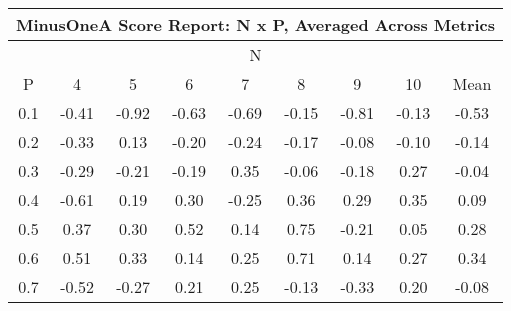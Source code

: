 \begin{longtable}{ | c || c | c | c | c | c | c | c || c |}
\hline
\multicolumn{9}{|c|}{ MinusOneA Score Report: N x P, Averaged Across Metrics } \\
\hline
\multicolumn{9}{|c|}{ N } \\
\hline
P & 4 & 5 & 6 & 7 & 8 & 9 & 10 & Mean\\
\hline
\hline
\endhead
0.1 &  \cellcolor[HTML]{FFF7F7} -0.41 &  \cellcolor[HTML]{FFE7E7} -0.92 &  \cellcolor[HTML]{FFEFEF} -0.63 &  \cellcolor[HTML]{FFEFEF} -0.69 &  \cellcolor[HTML]{FFFFFF} -0.15 &  \cellcolor[HTML]{FFE7E7} -0.81 &  \cellcolor[HTML]{FFFFFF} -0.13 &  \cellcolor[HTML]{FFEFEF} -0.53 \\
0.2 &  \cellcolor[HTML]{FFF7F7} -0.33 &  \cellcolor[HTML]{FFFFFF} 0.13 &  \cellcolor[HTML]{FFF7F7} -0.20 &  \cellcolor[HTML]{FFF7F7} -0.24 &  \cellcolor[HTML]{FFF7F7} -0.17 &  \cellcolor[HTML]{FFFFFF} -0.08 &  \cellcolor[HTML]{FFFFFF} -0.10 &  \cellcolor[HTML]{FFFFFF} -0.14 \\
0.3 &  \cellcolor[HTML]{FFF7F7} -0.29 &  \cellcolor[HTML]{FFF7F7} -0.21 &  \cellcolor[HTML]{FFF7F7} -0.19 &  \cellcolor[HTML]{F7F7FF} 0.35 &  \cellcolor[HTML]{FFFFFF} -0.06 &  \cellcolor[HTML]{FFF7F7} -0.18 &  \cellcolor[HTML]{F7F7FF} 0.27 &  \cellcolor[HTML]{FFFFFF} -0.04 \\
0.4 &  \cellcolor[HTML]{FFEFEF} -0.61 &  \cellcolor[HTML]{F7F7FF} 0.19 &  \cellcolor[HTML]{F7F7FF} 0.30 &  \cellcolor[HTML]{FFF7F7} -0.25 &  \cellcolor[HTML]{F7F7FF} 0.36 &  \cellcolor[HTML]{F7F7FF} 0.29 &  \cellcolor[HTML]{F7F7FF} 0.35 &  \cellcolor[HTML]{FFFFFF} 0.09 \\
0.5 &  \cellcolor[HTML]{F7F7FF} 0.37 &  \cellcolor[HTML]{F7F7FF} 0.30 &  \cellcolor[HTML]{EFEFFF} 0.52 &  \cellcolor[HTML]{FFFFFF} 0.14 &  \cellcolor[HTML]{EFEFFF} 0.75 &  \cellcolor[HTML]{FFF7F7} -0.21 &  \cellcolor[HTML]{FFFFFF} 0.05 &  \cellcolor[HTML]{F7F7FF} 0.28 \\
0.6 &  \cellcolor[HTML]{EFEFFF} 0.51 &  \cellcolor[HTML]{F7F7FF} 0.33 &  \cellcolor[HTML]{FFFFFF} 0.14 &  \cellcolor[HTML]{F7F7FF} 0.25 &  \cellcolor[HTML]{EFEFFF} 0.71 &  \cellcolor[HTML]{FFFFFF} 0.14 &  \cellcolor[HTML]{F7F7FF} 0.27 &  \cellcolor[HTML]{F7F7FF} 0.34 \\
0.7 &  \cellcolor[HTML]{FFEFEF} -0.52 &  \cellcolor[HTML]{FFF7F7} -0.27 &  \cellcolor[HTML]{F7F7FF} 0.21 &  \cellcolor[HTML]{F7F7FF} 0.25 &  \cellcolor[HTML]{FFFFFF} -0.13 &  \cellcolor[HTML]{FFF7F7} -0.33 &  \cellcolor[HTML]{F7F7FF} 0.20 &  \cellcolor[HTML]{FFFFFF} -0.08 \\

\end{longtable}
